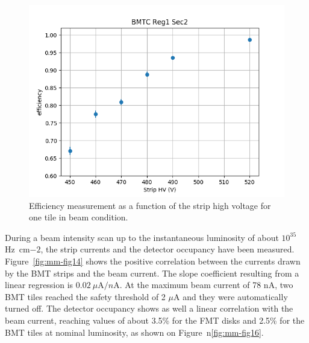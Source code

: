 \begin{figure}[htb]
 \includegraphics[width=1.0\columnwidth,keepaspectratio]{images/hvscan_BMTC_R1_S2.png}
 \caption{Efficiency measurement as a function of the strip high voltage for one tile in beam condition.}
 \label{fig:mm-eff_scan}
\end{figure}

During a beam intensity scan up to the instantaneous luminosity of about $10^{35}$Hz~cm${-2}$, the strip currents and the detector occupancy have been measured. Figure~\ref{fig:mm-fig14} shows the positive correlation between the currents drawn by the BMT strips and the beam current. The slope coefficient resulting from a linear regression is $0.02~\mu\text{A}/n\text{A}$. At the maximum beam current of 78 nA, two BMT tiles reached the safety threshold of 2 $\mu$A and they were automatically turned off. The detector occupancy shows as well a linear correlation with the beam current, reaching values of about 3.5\% for the FMT disks and 2.5\% for the BMT tiles at nominal luminosity, as shown on Figure~n\ref{fig:mm-fig16}.

